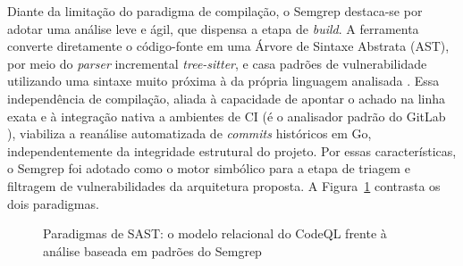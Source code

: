 Diante da limitação do paradigma de compilação, o Semgrep \cite{semgrepdocs} destaca-se por adotar uma análise leve e ágil, que dispensa a etapa de \textit{build}. A ferramenta converte diretamente o código-fonte em uma Árvore de Sintaxe Abstrata (AST), por meio do \textit{parser} incremental \textit{tree-sitter}, e casa padrões de vulnerabilidade utilizando uma sintaxe muito próxima à da própria linguagem analisada \cite{bennett2024semgrep}. Essa independência de compilação, aliada à capacidade de apontar o achado na linha exata e à integração nativa a ambientes de CI (é o analisador padrão do GitLab \cite{gitlabsast}), viabiliza a reanálise automatizada de \textit{commits} históricos em Go, independentemente da integridade estrutural do projeto. Por essas características, o Semgrep foi adotado como o motor simbólico para a etapa de triagem e filtragem de vulnerabilidades da arquitetura proposta. A Figura~\ref{fig:codeql-semgrep} contrasta os dois paradigmas.

\begin{figure}[htpb]
    \centering
    \caption{Paradigmas de SAST: o modelo relacional do CodeQL frente à análise baseada em padrões do Semgrep}
    \label{fig:codeql-semgrep}
    \fonteautores
\end{figure}

